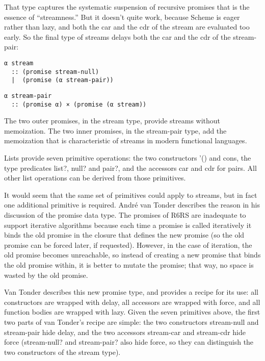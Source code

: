 That type captures the systematic suspension of recursive promises that
is the essence of ``streamness.'' But it doesn't quite work, because
Scheme is eager rather than lazy, and both the car and the cdr of the
stream are evaluated too early. So the final type of streams delays both
the car and the cdr of the stream-pair:

\begin{verbatim}
α stream
  :: (promise stream-null)
  |  (promise (α stream-pair))
\end{verbatim}

\begin{verbatim}
α stream-pair
  :: (promise α) × (promise (α stream))
\end{verbatim}

The two outer promises, in the stream type, provide streams without
memoization. The two inner promises, in the stream-pair type, add the
memoization that is characteristic of streams in modern functional
languages.

Lists provide seven primitive operations: the two constructors '() and
cons, the type predicates list?, null? and pair?, and the accessors car
and cdr for pairs. All other list operations can be derived from those
primitives.

It would seem that the same set of primitives could apply to streams,
but in fact one additional primitive is required. André van Tonder
describes the reason in his discussion of the promise data type. The
promises of R6RS are inadequate to support iterative algorithms because
each time a promise is called iteratively it binds the old promise in
the closure that defines the new promise (so the old promise can be
forced later, if requested). However, in the case of iteration, the old
promise becomes unreachable, so instead of creating a new promise that
binds the old promise within, it is better to mutate the promise; that
way, no space is wasted by the old promise.

Van Tonder describes this new promise type, and provides a recipe for
its use: all constructors are wrapped with delay, all accessors are
wrapped with force, and all function bodies are wrapped with lazy. Given
the seven primitives above, the first two parts of van Tonder's recipe
are simple: the two constructors stream-null and stream-pair hide delay,
and the two accessors stream-car and stream-cdr hide force (stream-null?
and stream-pair? also hide force, so they can distinguish the two
constructors of the stream type).

